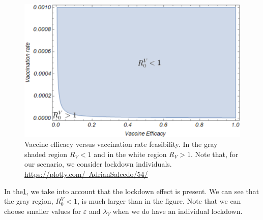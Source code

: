 \begin{figure}[tbh]
    \centering
      \includegraphics[scale=0.56, keepaspectratio]{Figures/Lockdown-Vaccination}
    \caption{
        Vaccine efficacy versus vaccination rate feasibility.
        In the gray shaded region $R_V<1 $ and in the white region $ R_V >1 $. 
        Note that, for our scenario, we consider lockdown individuals.
        \href{https://plotly.com/~AdrianSalcedo/54/}{%
		https://plotly.com/~AdrianSalcedo/54/}
    }
    \label{fig:Lockdown}
\end{figure}

In the\cref{fig:Lockdown}, we take into account that the lockdown effect is
present. We can see that the gray region, $ R_0 ^ V <1 $, is much larger than in
the figure. Note that we can choose smaller values for $ \varepsilon $ and $
\lambda_V $ when we do have an individual lockdown.